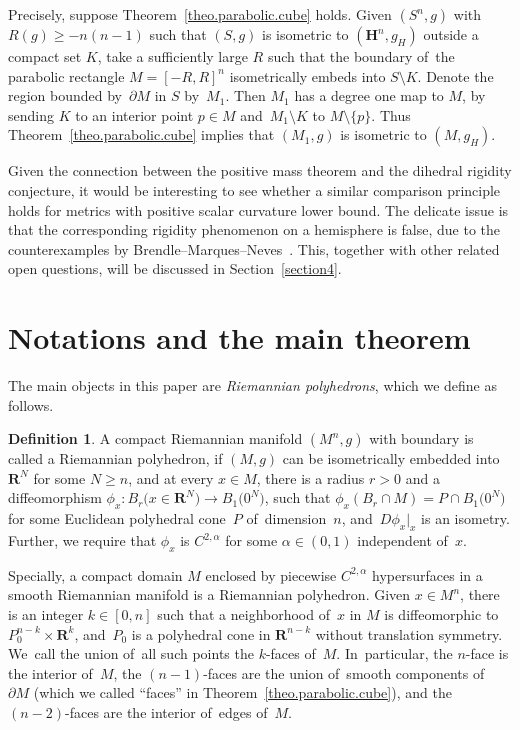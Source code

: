 \documentclass[10pt,a4paper]{amsart}
\numberwithin{equation}{section}
\theoremstyle{definition}
\newtheorem{defi}[prop]{Definition}
\newcommand{\HH}{\mathbf{H}}
\newcommand{\RR}{\mathbf{R}}
\begin{document}
Precisely, suppose Theorem~\ref{theo.parabolic.cube} holds. Given $(S^n,g)$ with $R(g)\ge -n(n-1)$ such that $(S,g)$ is isometric to $(\HH^n,g_H)$ outside a compact set $K$, take a sufficiently large $R$ such that the boundary of~the parabolic rectangle $M=[-R,R]^n$ isometrically embeds into $S\setminus K$. Denote the region bounded by~$\partial M$ in $S$ by~$M_1$. Then $M_1$ has a degree one map to $M$, by sending $K$ to an interior point $p\in M$ and~$M_1\setminus K$ to $M\setminus \{p\}$. Thus Theorem~\ref{theo.parabolic.cube} implies that $(M_1,g)$ is isometric to $(M,g_H)$.

Given the connection between the positive mass theorem and the dihedral rigidity conjecture, it would be interesting to see whether a similar comparison principle holds for metrics with positive scalar curvature lower bound. The delicate issue is that the corresponding rigidity phenomenon on a hemisphere is false, due to the counterexamples by Brendle--Marques--Neves~\cite{Brendle2011deformation}. This, together with other related open questions, will be discussed in Section~\ref{section4}.

\section{Notations and the main theorem}
The main objects in this paper are \textit{Riemannian polyhedrons}, which we define as follows.

\begin{defi}A compact Riemannian manifold $(M^n,g)$ with boundary is called a Riemannian polyhedron, if $(M,g)$ can be isometrically embedded into $\RR^N$ for some $N\ge n$, and at every $x\in M$, there is a radius $r>0$ and a diffeomorphism $\phi_x\colon B_r\big(x\in \RR^N\big)\rightarrow B_1\big(0^N\big)$, such that $\phi_x(B_r\cap M)=P\cap B_1\big(0^N\big)$ for some Euclidean polyhedral cone~$P$ of~dimension~$n$, and~$D\phi_x|_x$ is an isometry. Further, we require that $\phi_x$ is $C^{2,\alpha}$ for some $\alpha\in (0,1)$ independent of~$x$.
\end{defi}

Specially, a compact domain $M$ enclosed by piecewise $C^{2,\alpha}$ hypersurfaces in a smooth Riemannian manifold is a Riemannian polyhedron. Given $x\in M^n$, there is an integer $k\in [0, n]$ such that a neighborhood of~$x$ in $M$ is diffeomorphic to $P_0^{n-k}\times \RR^k$, and~$P_0$ is a polyhedral cone in $\RR^{n-k}$ without translation symmetry. We~call the union of~all such points the $k$-faces of~$M$. In~particular, the $n$-face is the interior of~$M$, the $(n-1)$-faces are the union of~smooth components of~$\partial M$ (which we called ``faces'' in Theorem~\ref{theo.parabolic.cube}), and the $(n-2)$-faces are the interior of~edges of~$M$.
\end{document}
